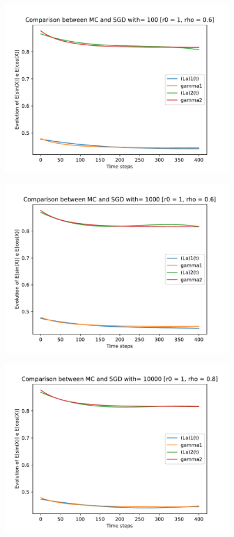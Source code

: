 \documentclass[a4paper,11pt,openright]{report}
\begin{document}
\begin{figure}[H]
\centering
\includegraphics[width=0.9\textwidth]{images/graphs T = 4/n = 3, M = 100 sine and cosine.pdf}
\end{figure}
\begin{figure}[H]
\centering
\includegraphics[width=0.9\textwidth]{images/graphs T = 4/n = 3, M = 1000 sine and cosine.pdf}
\end{figure}
\begin{figure}[H]
\centering
\includegraphics[width=0.9\textwidth]{images/graphs T = 4/n = 3, M = 10000 sine and cosine.pdf}
\end{figure}
\newpage
\end{document}
